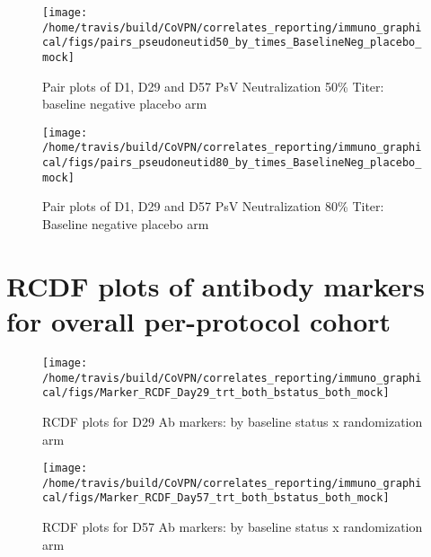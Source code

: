 \documentclass[]{book}
\theoremstyle{definition}
\theoremstyle{definition}
\theoremstyle{definition}
\newcommand{\1}{\mathbbm{1}}
\begin{document}
\clearpage
\begin{figure}[H]

{\centering \texttt{[image: /home/travis/build/CoVPN/correlates\_reporting/immuno\_graphical/figs/pairs\_pseudoneutid50\_by\_times\_BaselineNeg\_placebo\_mock]} 

}

\caption{Pair plots of D1, D29 and D57 PsV Neutralization 50\% Titer: baseline negative placebo arm}\label{fig:unnamed-chunk-19}
\end{figure}

\clearpage
\begin{figure}[H]

{\centering \texttt{[image: /home/travis/build/CoVPN/correlates\_reporting/immuno\_graphical/figs/pairs\_pseudoneutid80\_by\_times\_BaselineNeg\_placebo\_mock]} 

}

\caption{Pair plots of D1, D29 and D57 PsV Neutralization 80\% Titer: Baseline negative placebo arm}\label{fig:unnamed-chunk-20}
\end{figure}

\clearpage

\hypertarget{rcdf-plots-of-antibody-markers-for-overall-per-protocol-cohort}{%
\section{RCDF plots of antibody markers for overall per-protocol cohort}\label{rcdf-plots-of-antibody-markers-for-overall-per-protocol-cohort}}

\begin{figure}[H]

{\centering \texttt{[image: /home/travis/build/CoVPN/correlates\_reporting/immuno\_graphical/figs/Marker\_RCDF\_Day29\_trt\_both\_bstatus\_both\_mock]} 

}

\caption{RCDF plots for D29 Ab markers: by baseline status x randomization arm}\label{fig:unnamed-chunk-21}
\end{figure}

\clearpage
\begin{figure}[H]

{\centering \texttt{[image: /home/travis/build/CoVPN/correlates\_reporting/immuno\_graphical/figs/Marker\_RCDF\_Day57\_trt\_both\_bstatus\_both\_mock]} 

}

\caption{RCDF plots for D57 Ab markers: by baseline status x randomization arm}\label{fig:unnamed-chunk-22}
\end{figure}
\end{document}
